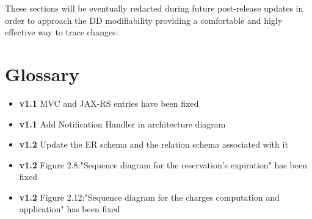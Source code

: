 These sections will be eventually redacted during future post-release updates in order to approach the DD modifiability providing a comfortable and higly effective way to trace changes:
\section{Glossary}
	\begin{itemize}
		\item \textbf{v1.1} MVC and JAX-RS entries have been fixed
		\item \textbf{v1.1} Add Notification Handler in architecture diagram
		\item \textbf{v1.2} Update the ER schema and the relation schema associated with it
		\item \textbf{v1.2} Figure 2.8:"Sequence diagram for the reservation’s expiration" has been fixed
		\item \textbf{v1.2} Figure 2.12:"Sequence diagram for the charges computation and application" has been fixed
	\end{itemize}
